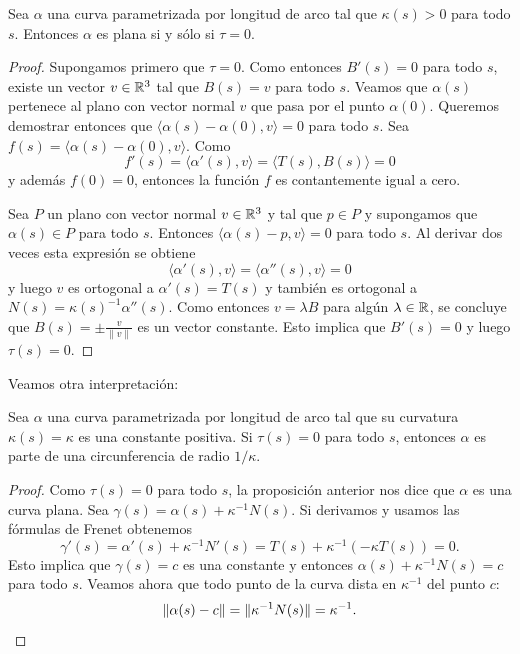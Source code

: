 \begin{proposition}
	Sea $\alpha$ una curva parametrizada por longitud de arco
	tal que $\kappa(s)>0$ para todo $s$. Entonces $\alpha$ es plana si y sólo si $\tau=0$.
\end{proposition}

\begin{proof}
	Supongamos primero que $\tau=0$. Como entonces $B'(s)=0$ para todo $s$,
	existe un vector $v\in\mathbb{R}^3$ tal que $B(s)=v$ para todo $s$. Veamos que
	$\alpha(s)$ pertenece al plano con vector normal $v$ que pasa por el punto
	$\alpha(0)$. Queremos demostrar entonces que
	$\langle \alpha(s)-\alpha(0),v\rangle=0$ para todo $s$. Sea $f(s)=\langle \alpha(s)-\alpha(0),v\rangle$. Como 
	\[
		f'(s)=\langle\alpha'(s),v\rangle=\langle T(s),B(s)\rangle=0
	\]
	y además $f(0)=0$, entonces 
	la función $f$ es contantemente igual a cero. 

	Sea $P$ un plano con vector normal $v\in\mathbb{R}^3$ y tal que $p\in P$ y supongamos que 
	$\alpha(s)\in P$ para todo $s$. Entonces $\langle\alpha(s)-p,v\rangle=0$
	para todo $s$. Al derivar dos veces esta expresión se obtiene
	\[
		\langle \alpha'(s),v\rangle=\langle\alpha''(s),v\rangle=0
	\]
	y luego $v$ es ortogonal a $\alpha'(s)=T(s)$ y también es ortogonal a
	$N(s)=\kappa(s)^{-1}\alpha''(s)$. Como entonces $v=\lambda B$ para algún
	$\lambda\in\mathbb{R}$, se concluye que $B(s)=\pm \frac{v}{\|v\|}$ es un vector
	constante. Esto implica que $B'(s)=0$ y luego $\tau(s)=0$. 
\end{proof}

Veamos otra interpretación:

\begin{proposition}
	Sea $\alpha$ una curva parametrizada por longitud de arco tal que su
	curvatura $\kappa(s)=\kappa$ es una constante positiva.  Si $\tau(s)=0$
	para todo $s$, entonces $\alpha$ es parte de una circunferencia de radio
	$1/\kappa$.
\end{proposition}

\begin{proof}
	Como $\tau(s)=0$ para todo $s$, la proposición anterior nos dice que
	$\alpha$ es una curva plana. Sea $\gamma(s)=\alpha(s)+\kappa^{-1}N(s)$. Si
	derivamos y usamos las fórmulas de Frenet obtenemos
	\[
		\gamma'(s)=\alpha'(s)+\kappa^{-1}N'(s)=T(s)+\kappa^{-1}(-\kappa T(s))=0.
	\]
	Esto implica que $\gamma(s)=c$ es una constante y entonces
	$\alpha(s)+\kappa^{-1}N(s)=c$ para todo $s$. Veamos ahora que todo punto de
	la curva dista en $\kappa^{-1}$ del punto $c$:
	\[
		\|\alpha(s)-c\|=\|\kappa^{-1}N(s)\|=\kappa^{-1}.\qedhere
	\]
\end{proof}

